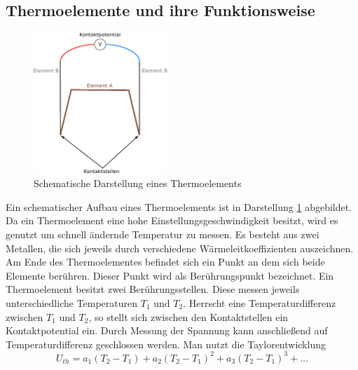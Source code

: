 \subsection{Thermoelemente und ihre Funktionsweise} %
\begin{figure}
  \centering
  \includegraphics[width=0.45\textwidth]{bilder/thermoelement.pdf}
  \caption{Schematische Darstellung eines Thermoelements}
  \label{fig:thermo}
\end{figure}
Ein schematischer Aufbau eines Thermoelements ist in  Darstellung \ref{fig:thermo} %
abgebildet.
Da ein Thermoelement eine hohe Einstellungsgeschwindigkeit besitzt,
wird es genutzt um schnell ändernde Temperatur zu messen. %
Es besteht aus zwei Metallen, die sich jeweils durch
verschiedene Wärmeleitkoeffizienten auszeichnen.
Am Ende des Thermoelementes befindet sich ein Punkt an dem sich
beide Elemente berühren. Dieser Punkt wird als Berührungspunkt
bezeichnet.
Ein Thermoelement besitzt zwei Berührungsstellen.
Diese messen jeweils unterschiedliche Temperaturen $T_1$ und $T_2$.
Herrscht eine Temperaturdifferenz zwischen $T_1$ und $T_2$, so
stellt sich zwischen den Kontaktstellen ein Kontaktpotential %
ein.
Durch Messung der Spannung kann anschließend auf
Temperaturdifferenz geschlossen werden.
Man nutzt die Taylorentwicklung
\begin{equation*}
U_{th}=a_1\left(T_2-T_1\right)+a_2\left(T_2-T_1\right)^2+a_3\left(T_2-T_1\right)^3+\dots
\end{equation*} %
